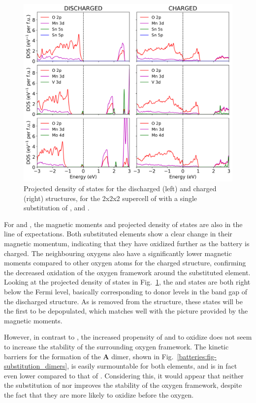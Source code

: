 \begin{refsection}
\begin{figure}[h]
\centering
\includegraphics[width=\textwidth]{figures/batteries/substitution_pdos_pbeu.png}
\caption{Projected density of states for the discharged (left) and charged (right) structures, for the 2x2x2 supercell of  with a single substitution of ,  and .}
\label{batteries:fig-substitution_pdos_pbeu}
\end{figure}

For  and , the magnetic moments and projected density of states are also in the line of expectations. Both substituted elements show a clear change in their magnetic momentum, indicating that they have oxidized further as the battery is charged. The neighbouring oxygens  also have a significantly lower magnetic moments compared to other oxygen atoms  for the charged structure, confirming the decreased oxidation of the oxygen framework around the substituted element. Looking at the projected density of states in Fig.~\ref{batteries:fig-substitution_pdos_pbeu}, the  and  states are both right below the Fermi level, basically corresponding to donor levels in the band gap of the discharged  structure. As  is removed from the structure, these states will be the first to be depopulated, which matches well with the picture provided by the magnetic moments.

However, in contrast to , the increased propensity of  and  to oxidize does not seem to increase the stability of the surrounding oxygen framework. The kinetic barriers for the formation of the \textbf{A} dimer, shown in Fig.~\ref{batteries:fig-substitution_dimers}, is easily surmountable for both elements, and is in fact even lower compared to that of . Considering this, it would appear that neither the substitution of  nor  improves the stability of the oxygen framework, despite the fact that they are more likely to oxidize before the oxygen. 


\end{refsection}
